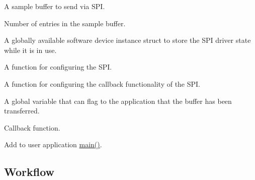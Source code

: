 A sample buffer to send via S\+PI. 
\begin{DoxyCodeInclude}{0}
\end{DoxyCodeInclude}
Number of entries in the sample buffer. 
\begin{DoxyCodeInclude}{0}
\end{DoxyCodeInclude}
A globally available software device instance struct to store the S\+PI driver state while it is in use. 
\begin{DoxyCodeInclude}{0}
\end{DoxyCodeInclude}
A function for configuring the S\+PI. 
\begin{DoxyCodeInclude}{0}
\end{DoxyCodeInclude}
A function for configuring the callback functionality of the S\+PI. 
\begin{DoxyCodeInclude}{0}
\end{DoxyCodeInclude}
A global variable that can flag to the application that the buffer has been transferred. 
\begin{DoxyCodeInclude}{0}
\end{DoxyCodeInclude}
Callback function. 
\begin{DoxyCodeInclude}{0}
\end{DoxyCodeInclude}
 Add to user application {\ttfamily \mbox{\hyperlink{csc__app_8c_a840291bc02cba5474a4cb46a9b9566fe}{main()}}}. 
\begin{DoxyCodeInclude}{0}
\end{DoxyCodeInclude}
 \hypertarget{asfdoc_sam0_sercom_spi_slave_callback_use_asfdoc_sam0_sercom_spi_slave_callback_use_workflow}{}\subsection{Workflow}\label{asfdoc_sam0_sercom_spi_slave_callback_use_asfdoc_sam0_sercom_spi_slave_callback_use_workflow}

